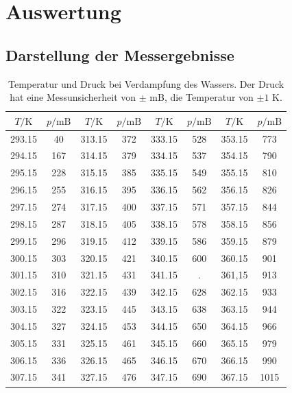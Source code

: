 \usepackage{siunitx}\newpage
\section{Auswertung}
\label{sec:Auswertung}

\subsection{Darstellung der Messergebnisse}
\begin{table}[H]
  \centering
  \caption{Temperatur und Druck bei Verdampfung des Wassers. Der Druck hat eine Messunsicherheit von
  $\pm$ mB, die Temperatur von $\pm 1$ K.}
  \label{tab:Messreihe_1}
\begin{tabular}{
  c c||c c||c c||c c
}
\toprule 
$T/ \unit{\kelvin}$ & $p / \text{mB}$ & $T/ \unit{\kelvin}$ & $p / \text{mB}$&
$T/ \unit{\kelvin}$ & $p / \text{mB}$ & $T/ \unit{\kelvin}$ & $p / \text{mB}$ \\
\midrule
293.15  & 40   & 313.15  & 372  & 333.15  & 528  & 353.15  & 773 \\
294.15  & 167  & 314.15  & 379  & 334.15  & 537  & 354.15  & 790 \\
295.15  & 228  & 315.15  & 385  & 335.15  & 549  & 355.15  & 810 \\
296.15  & 255  & 316.15  & 395  & 336.15  & 562  & 356.15  & 826 \\
297.15  & 274  & 317.15  & 400  & 337.15  & 571  & 357.15  & 844 \\
298.15  & 287  & 318.15  & 405  & 338.15  & 578  & 358.15  & 856 \\
299.15  & 296  & 319.15  & 412  & 339.15  & 586  & 359.15  & 879 \\
300.15  & 303  & 320.15  & 421  & 340.15  & 600  & 360.15  & 901 \\
301.15  & 310  & 321.15  & 431  & 341.15  & \text{--} .& 361,15  & 913 \\
302.15  & 316  & 322.15  & 439  & 342.15  & 628  & 362.15  & 933 \\
303.15  & 322  & 323.15  & 445  & 343.15  & 638  & 363.15  & 944 \\
304.15  & 327  & 324.15  & 453  & 344.15  & 650  & 364.15  & 966 \\
305.15  & 331  & 325.15  & 461  & 345.15  & 660  & 365.15  & 979 \\
306.15  & 336  & 326.15  & 465  & 346.15  & 670  & 366.15  & 990 \\
307.15  & 341  & 327.15  & 476  & 347.15  & 690  & 367.15  & 1015\\

\end{tabular}
\end{table}
